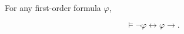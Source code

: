 For any first-order formula $\varphi$,

$$\models \neg \varphi \leftrightarrow \varphi \rightarrow.$$
